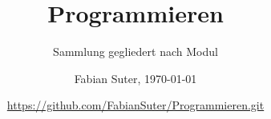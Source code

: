 \documentclass[8pt, a4paper, fleqn, landscape]{scrartcl}
\title{Programmieren}
\subtitle{Sammlung gegliedert nach Modul}
\author{Fabian Suter, \today}
\date{{\small \url{https://github.com/FabianSuter/Programmieren.git}}}
\begin{document}
	\begin{multicols*}{2}
		\maketitle

		
	
	\end{multicols*}	
\end{document}
